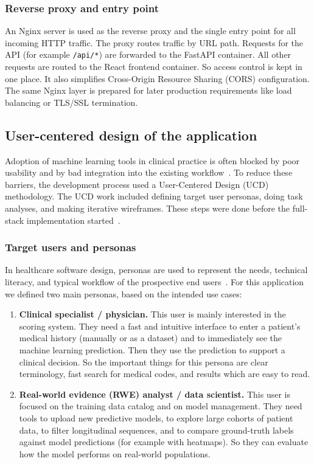 \subsubsection{Reverse proxy and entry point}
An Nginx server is used as the reverse proxy and the single entry point for all incoming HTTP traffic. The proxy routes traffic by URL path. Requests for the API (for example \texttt{/api/*}) are forwarded to the FastAPI container. All other requests are routed to the React frontend container. So access control is kept in one place. It also simplifies Cross-Origin Resource Sharing (CORS) configuration. The same Nginx layer is prepared for later production requirements like load balancing or TLS/SSL termination.


\subsection{User-centered design of the application}
\label{subsec:ux_design}

Adoption of machine learning tools in clinical practice is often blocked by poor usability and by bad integration into the existing workflow~\cite{ucd_ml_dashboard_2023}. To reduce these barriers, the development process used a User-Centered Design (UCD) methodology. The UCD work included defining target user personas, doing task analyses, and making iterative wireframes. These steps were done before the full-stack implementation started~\cite{jmir_personas_2022}.

\subsubsection{Target users and personas}
In healthcare software design, personas are used to represent the needs, technical literacy, and typical workflow of the prospective end users~\cite{personas_healthcare_2022}. For this application we defined two main personas, based on the intended use cases:

\begin{enumerate}
    \item \textbf{Clinical specialist / physician.} This user is mainly interested in the scoring system. They need a fast and intuitive interface to enter a patient's medical history (manually or as a dataset) and to immediately see the machine learning prediction. Then they use the prediction to support a clinical decision. So the important things for this persona are clear terminology, fast search for medical codes, and results which are easy to read.
    \item \textbf{Real-world evidence (RWE) analyst / data scientist.} This user is focused on the training data catalog and on model management. They need tools to upload new predictive models, to explore large cohorts of patient data, to filter longitudinal sequences, and to compare ground-truth labels against model predictions (for example with heatmaps). So they can evaluate how the model performs on real-world populations.
\end{enumerate}

